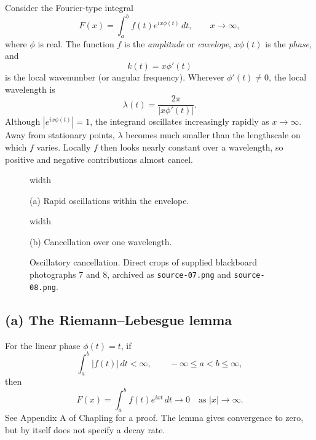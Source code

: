 \documentclass[11pt,a4paper]{article}
\begin{document}
Consider the Fourier-type integral
\[
    F(x)=\int_a^b f(t)e^{ix\phi(t)}\,dt,
    \qquad x\to\infty,
\]
where $\phi$ is real. The function $f$ is the \emph{amplitude} or
\emph{envelope}, $x\phi(t)$ is the \emph{phase}, and
\[
    k(t)=x\phi'(t)
\]
is the local wavenumber (or angular frequency). Wherever $\phi'(t)\neq0$,
the local wavelength is
\[
    \lambda(t)=\frac{2\pi}{|x\phi'(t)|}.
\]
Although $|e^{ix\phi(t)}|=1$, the integrand oscillates increasingly
rapidly as $x\to\infty$. Away from stationary points, $\lambda$ becomes
much smaller than the lengthscale on which $f$ varies. Locally $f$ then
looks nearly constant over a wavelength, so positive and negative
contributions almost cancel.
\begin{figure}[htbp]
    \centering
    \begin{minipage}[t]{0.61\linewidth}
        \centering
        \pdfximage width \linewidth {figures/asymptotic-lecture7/oscillations.jpg}
        \pdfrefximage\pdflastximage
        \par\smallskip (a) Rapid oscillations within the envelope.
    \end{minipage}\hfill
    \begin{minipage}[t]{0.34\linewidth}
        \centering
        \pdfximage width \linewidth {figures/asymptotic-lecture7/one-wavelength.jpg}
        \pdfrefximage\pdflastximage
        \par\smallskip (b) Cancellation over one wavelength.
    \end{minipage}
    \caption{Oscillatory cancellation. Direct crops of supplied
    blackboard photographs 7 and 8, archived as
    \texttt{source-07.png} and \texttt{source-08.png}.}
    \label{fig:am-lecture7-cancellation}
\end{figure}

\subsection*{(a) The Riemann--Lebesgue lemma}
For the linear phase $\phi(t)=t$, if
\[
    \int_a^b|f(t)|\,dt<\infty,
    \qquad-\infty\leq a<b\leq\infty,
\]
then
\[
    \boxed{F(x)=\int_a^b f(t)e^{ixt}\,dt\longrightarrow0
    \quad\text{as }|x|\to\infty.}
\]
See Appendix A of Chapling for a proof. The lemma gives convergence to
zero, but by itself does not specify a decay rate.
\end{document}
